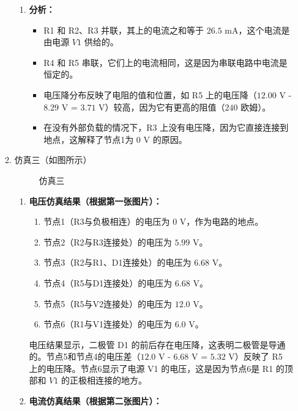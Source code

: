 \documentclass[dvipsnames, svgnames,a4paper,11pt]{article}
\begin{document}
\begin{enumerate}
\begin{enumerate}
\begin{enumerate}
				\item \textbf{分析：}
				\begin{itemize}
					\item R1 和 R2、R3 并联，其上的电流之和等于 $26.5$ mA，这个电流是由电源 $V1$ 供给的。
					\item R4 和 R5 串联，它们上的电流相同，这是因为串联电路中电流是恒定的。
					\item 电压降分布反映了电阻的值和位置，如 R5 上的电压降（$12.00$ V - $8.29$ V = $3.71$ V）较高，因为它有更高的阻值（$240$ 欧姆）。
					\item 在没有外部负载的情况下，R3 上没有电压降，因为它直接连接到地点，这解释了节点1为 $0$ V 的原因。
				\end{itemize}
			\end{enumerate}
			
			\item 仿真三（如图所示）
			
			\begin{figure}[htbp]
				\centering
				\caption{仿真三}
				\label{fig:fig3-2}			
			\end{figure}
			
			\begin{enumerate}
				\item \textbf{电压仿真结果（根据第一张图片）：}
				
				\begin{enumerate}
					\item 节点1（R3与负极相连）的电压为 $0$ V，作为电路的地点。
					\item 节点2（R2与R3连接处）的电压为 $5.99$ V。
					\item 节点3（R2与R1、D1连接处）的电压为 $6.68$ V。
					\item 节点4（R5与D1连接处）的电压为 $6.68$ V。
					\item 节点5（R5与V2连接处）的电压为 $12.0$ V。
					\item 节点6（R1与V1连接处）的电压为 $6.0$ V。
				\end{enumerate}
				
				电压结果显示，二极管 D1 的前后存在电压降，这表明二极管是导通的。节点5和节点4的电压差（$12.0$ V - $6.68$ V = $5.32$ V）反映了 R5 上的电压降。节点6显示了电源 V1 的电压，这是因为节点6是 R1 的顶部和 $V1$ 的正极相连接的地方。
				
				\item \textbf{电流仿真结果（根据第二张图片）：}
				

\end{enumerate}
\end{enumerate}
\end{enumerate}
\end{document}
